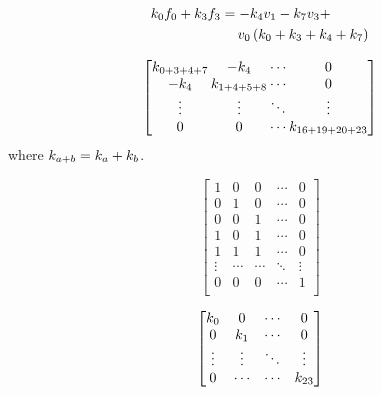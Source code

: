 \begin{equation}\label{eq:implementation:forceOnVoVersimpled}
	\begin{split}
	k_{0}f_{0} + k_{3}f_{3} 
		&= - k_{4}v_{1} - k_{7}v_{3} + \\
		& \quad\: v_{0} \left( k_{0} + k_{3} + k_{4} + k_{7} \right)
	\end{split}
\end{equation}

\begin{equation}\label{eq:implementation:rhs}
{
	\arraycolsep=1pt
	\begin{bmatrix}
		\spring{0 + 3 + 4 + 7}	& -\spring{4}			& \cdots & 0\\
		- \spring{4} 			& \spring{1 + 4+ 5 + 8}	& \cdots & 0\\
		\vdots					& \vdots 				& \ddots & \vdots\\
		0						& 0 					& \cdots & \spring{16 + 19 + 20 + 23}\\
	\end{bmatrix}
}
\end{equation}
where $k_{a + b} = k_{a} + k_{b}$. 

\begin{equation}\label{eq:implementation:adjacency}
	\begin{bmatrix}
		1 		& 0 		& 0 		& \cdots 	& 0\\
		0 		& 1 		& 0 		& \cdots 	& 0\\
		0 		& 0 		& 1 		& \cdots 	& 0\\
		1 		& 0 		& 1 		& \cdots 	& 0\\
		1 		& 1 		& 1 		& \cdots 	& 0\\
		\vdots	& \cdots 	& \cdots 	& \ddots 	& \vdots\\
		0 		& 0 		& 0 		& \cdots 	& 1\\
	\end{bmatrix}
\end{equation}

\begin{equation}\label{eq:implementation:springConstantMatrix}
	\begin{bmatrix}
		k_{0} 	& 0 			& \cdots & 0\\
		0 			& k_{1}	& \cdots & 0\\	
		\vdots 		& \vdots		& \ddots & \vdots\\
		0 			& \cdots		& \cdots & k_{23}\\
	\end{bmatrix}
\end{equation}

